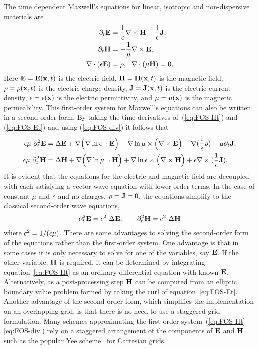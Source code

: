 \documentclass{article}
\begin{document}
The time dependent Maxwell's equations for linear, isotropic and non-dispersive materials are
\begin{align}
  \partial_t \mathbf{ E} &=  {1\over \epsilon} \nabla\times\mathbf{ H} - {1\over \epsilon}\mathbf{ J} , \label{eq:FOS-Et}  \\
  \partial_t \mathbf{ H} &= - {1\over \mu} \nabla\times\mathbf{ E} ,  \label{eq:FOS-Ht} \\
  \nabla\cdot(\epsilon\mathbf{ E}) &=\rho , ~~ \nabla\cdot(\mu\mathbf{ H}) = 0 , \label{eq:FOS-div}
\end{align}
Here $\mathbf{ E}=\mathbf{ E}(\mathbf{ x},t)$ is the electric field, 
$\mathbf{ H}=\mathbf{ H}(\mathbf{ x},t)$ is the magnetic field, $\rho=\rho(\mathbf{ x},t)$ is the electric charge density,
$\mathbf{ J}=\mathbf{ J}(\mathbf{ x},t)$ is the electric current density,
$\epsilon=\epsilon(\mathbf{ x})$ is the electric permittivity, and $\mu=\mu(\mathbf{ x})$ is the magnetic permeability.
This first-order system for Maxwell's equations can also be written in a
second-order form. By taking the time derivatives of~(\ref{eq:FOS-Ht}) and
(\ref{eq:FOS-Et}) and using (\ref{eq:FOS-div}) it follows that 
\begin{align}
 \epsilon\mu~\partial_t^2 \mathbf{ E} &= \Delta \mathbf{ E} + \nabla\Big( \nabla \ln\epsilon~\cdot\mathbf{ E} \Big)
        +\nabla\ln\mu\times\Big(\nabla\times\mathbf{ E}\Big) 
            -\nabla(\frac{1}{\epsilon}\rho)- \mu \partial_t\mathbf{ J} , \label{eq:waveEGen} \\
 \epsilon\mu~\partial_t^2 \mathbf{ H} &= \Delta \mathbf{ H} + \nabla\Big( \nabla \ln\mu~\cdot\mathbf{ H} \Big)
                               +\nabla\ln\epsilon\times\Big(\nabla\times\mathbf{ H}\Big) 
                     + \epsilon\nabla\times(\frac{1}{\epsilon}\mathbf{ J} ) \label{eq:waveHGen}.
\end{align}
It is evident that the equations for the electric and magnetic field are decoupled with each 
satisfying a vector wave equation with lower order terms.
In the case of constant $\mu$ and $\epsilon$ and no charges, $\rho=\mathbf{ J}=0$, 
the equations simplify to the classical second-order wave equations,
\begin{align}
  \partial_t^2 \mathbf{ E} = c^2~ \Delta \mathbf{ E} , \qquad
  \partial_t^2 \mathbf{ H} = c^2~ \Delta \mathbf{ H} \label{eq:waveE}
\end{align}
where $c^2=1/(\epsilon\mu)$.
There are some advantages to solving the second-order form of the equations
rather than the first-order system. One advantage is that in some cases it is
only necessary to solve for one of the variables, say $\mathbf{ E}$. 
If the other variable, $\mathbf{ H}$ is required, it can be
determined by
integrating equation~\eqref{eq:FOS-Ht} as an ordinary differential equation
with known $\mathbf{ E}$. Alternatively, as a post-processing step $\mathbf{ H}$ can be computed from an
elliptic boundary value problem formed by taking the curl of equation~\eqref{eq:FOS-Et}.
Another advantage of the second-order form, which simplifies the implementation on
an overlapping grid, is that there is no need to use a staggered grid formulation. 
Many schemes approximating the first order system~(\ref{eq:FOS-Ht}-\ref{eq:FOS-div}) rely on a
staggered arrangement of the components of $\mathbf{ E}$ and $\mathbf{ H}$ such as the
popular Yee scheme~\cite{Yee66} for Cartesian grids. 
\end{document}
